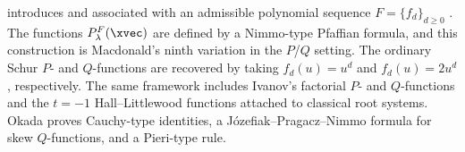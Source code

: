  introduces
\label{generalizedSchurPFunction} and
\label{generalizedSchurQFunction}
associated with an admissible polynomial sequence $F=\{f_d\}_{d\geq 0}$
\cite{Okada2019x}.  The functions $P^F_\lambda(\xvec)$ are defined by a
Nimmo-type Pfaffian formula, and this construction is Macdonald's ninth
variation in the $P$/$Q$ setting.  The ordinary Schur $P$- and $Q$-functions
are recovered by taking $f_d(u)=u^d$ and $f_d(u)=2u^d$, respectively.
The same framework includes Ivanov's factorial $P$- and $Q$-functions and
the $t=-1$ Hall--Littlewood functions attached to classical root systems.
Okada proves Cauchy-type identities, a J{\'o}zefiak--Pragacz--Nimmo formula
for skew $Q$-functions, and a Pieri-type rule.

